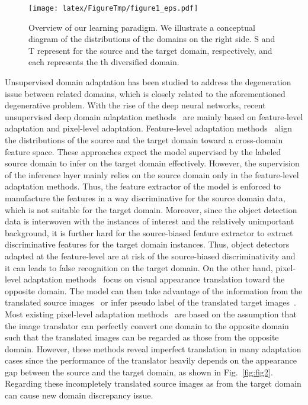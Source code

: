 \documentclass[10pt,twocolumn,letterpaper]{article}
\begin{document}
\begin{figure}[t]
\begin{center}
\texttt{[image: latex/FigureTmp/figure1\_eps.pdf]}
\end{center}
  \caption{Overview of our learning paradigm. We illustrate a conceptual diagram of the distributions of the domains on the right side. S and T represent for the source and the target domain, respectively, and each  represents the th diversified domain.}
\label{fig:Intro}
\end{figure}


Unsupervised domain adaptation has been studied to address the degeneration issue between related domains, which is closely related to the aforementioned degenerative problem.
With the rise of the deep neural networks, recent unsupervised deep domain adaptation methods~\cite{DeepAlign1_DAN, DeepAlign2_GRL,DeepAlign3_DCORAL, DeepAlign4_AutoDial, pixel1_sbadagan, pix3_pixlevel, seg1_CyCADA} are mainly based on feature-level adaptation and pixel-level adaptation.
Feature-level adaptation methods~\cite{DeepAlign1_DAN,DeepAlign2_GRL,DeepAlign3_DCORAL,DeepAlign4_AutoDial} align the distributions of the source and the target domain toward a cross-domain feature space.
These approaches expect the model supervised by the labeled source domain to infer on the target domain effectively.
However, the supervision of the inference layer mainly relies on the source domain only in the feature-level adaptation methods.
Thus, the feature extractor of the model is enforced to manufacture the features in a way discriminative for the source domain data, which is not suitable for the target domain.
Moreover, since the object detection data is interwoven with the instances of interest and the relatively unimportant background, it is further hard for the source-biased feature extractor to extract discriminative features for the target domain instances.
Thus, object detectors adapted at the feature-level are at risk of the source-biased discriminativity and it can leads to false recognition on the target domain.
On the other hand, pixel-level adaptation methods~\cite{pixel1_sbadagan, pix3_pixlevel, seg1_CyCADA} focus on visual appearance translation toward the opposite domain.
The model can then take advantage of the information from the translated source images~\cite{seg1_CyCADA, pix3_pixlevel} or infer pseudo label of the translated target images~\cite{Inoue_2018_CVPR}.
Most existing pixel-level adaptation methods~\cite{pixel1_sbadagan, pix3_pixlevel, seg1_CyCADA} are based on the assumption that the image translator can perfectly convert one domain to the opposite domain such that the translated images can be regarded as those from the opposite domain.
However, these methods reveal imperfect translation in many adaptation cases since the performance of the translator heavily depends on the appearance gap between the source and the target domain, as shown in Fig.~\ref{fig:fig2}. 
Regarding these incompletely translated source images as from the target domain can cause new domain discrepancy issue.
\end{document}
